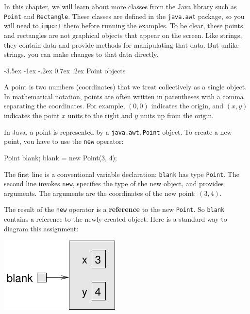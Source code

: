 \documentclass[12pt]{book}
\makeatletter
\theoremstyle{exercise}
\newcommand{\java}[1]{\verb"#1"}
\renewcommand{\section}{\@startsection {section}{1}{\z@}%
    {-3.5ex \@plus -1ex \@minus -.2ex}%
    {0.7ex \@plus.2ex}%
    {\normalfont\Large\bfseries}}
\newcommand{\java}[1]{\lstinline{#1}} %
\makeatother
\begin{document}
In this chapter, we will learn about more classes from the Java library such as \java{Point} and \java{Rectangle}.
These classes are defined in the \java{java.awt} package, so you will need to \java{import} them before running the examples.
To be clear, these points and rectangles are not graphical objects that appear on the screen.
Like strings, they contain data and provide methods for manipulating that data.
But unlike strings, you can make changes to that data directly.


\section{Point objects}

A point is two numbers (coordinates) that we treat collectively as a single object.
In mathematical notation, points are often written in parentheses with a comma separating the coordinates.
For example, $(0,0)$ indicates the origin, and $(x,y)$ indicates the point $x$ units to the right and $y$ units up from the origin.


In Java, a point is represented by a \java{java.awt.Point} object.
To create a new point, you have to use the \java{new} operator:

\begin{code}
    Point blank;
    blank = new Point(3, 4);
\end{code}


The first line is a conventional variable declaration: \java{blank} has type \java{Point}.
The second line invokes \java{new}, specifies the type of the new object, and provides arguments.
The arguments are the coordinates of the new point: $(3, 4)$.


The result of the \java{new} operator is a {\bf reference} to the new \java{Point}.
So \java{blank} contains a reference to the newly-created object.
Here is a standard way to diagram this assignment:

\begin{center}
\includegraphics{figs/reference.pdf}
\end{center}
\end{document}
